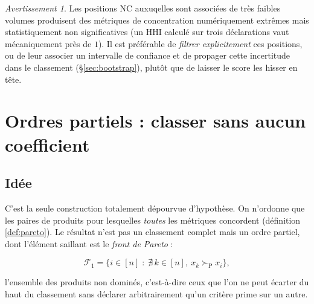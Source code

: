 \documentclass[11pt,a4paper]{article}
\theoremstyle{definition}
\theoremstyle{remark}
\newtheorem{avertissement}{Avertissement}[section]
\newcommand{\pareto}{\succ_{\mathrm{P}}}
\begin{document}
\bigskip

\begin{avertissement}
  Les positions NC auxuqelles sont associées de très faibles volumes produisent des métriques de concentration numériquement
  extrêmes mais statistiquement non significatives (un HHI calculé sur trois déclarations vaut
  mécaniquement près de $1$). Il est préférable de \emph{filtrer explicitement} ces positions,
  ou de leur associer un intervalle de confiance et de propager cette incertitude dans le
  classement (§\ref{sec:bootstrap}), plutôt que de laisser le score les hisser en tête.
\end{avertissement}

\bigskip

\section{Ordres partiels : classer sans aucun coefficient}
\label{sec:pareto}

\subsection{Idée}

C'est la seule construction totalement dépourvue d'hypothèse. On n'ordonne que les paires de
produits pour lesquelles \emph{toutes} les métriques concordent (définition \ref{def:pareto}).
Le résultat n'est pas un classement complet mais un ordre partiel, dont l'élément saillant est
le \emph{front de Pareto} :

\medskip

\[
\mathcal{F}_1 = \big\{ i \in [n] \;:\; \nexists\, k \in [n],\ x_k \pareto x_i \big\},
\]

\bigskip

l'ensemble des produits non dominés, c'est-à-dire ceux que l'on ne peut écarter du haut du
classement sans déclarer arbitrairement qu'un critère prime sur un autre.

\bigskip
\end{document}
